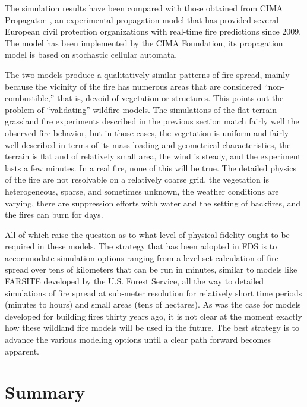 \documentclass[journal,article,atmosphere,submit,moreauthors,pdftex]{Definitions/mdpi}
\begin{document}
The simulation results have been compared with those obtained from CIMA Propagator~\cite{Trucchia:2020}, an experimental propagation model that has provided several European civil protection organizations with real-time fire predictions since 2009. The model has been implemented by the CIMA Foundation, its propagation model is based on stochastic cellular automata.

The two models produce a qualitatively similar patterns of fire spread, mainly because the vicinity of the fire has numerous areas that are considered ``non-combustible,'' that is, devoid of vegetation or structures. This points out the problem of ``validating'' wildfire models. The simulations of the flat terrain grassland fire experiments described in the previous section match fairly well the observed fire behavior, but in those cases, the vegetation is uniform and fairly well described in terms of its mass loading and geometrical characteristics, the terrain is flat and of relatively small area, the wind is steady, and the experiment lasts a few minutes. In a real fire, none of this will be true. The detailed physics of the fire are not resolvable on a relatively coarse grid, the vegetation is heterogeneous, sparse, and sometimes unknown, the weather conditions are varying, there are suppression efforts with water and the setting of backfires, and the fires can burn for days.

All of which raise the question as to what level of physical fidelity ought to be required in these models. The strategy that has been adopted in FDS is to accommodate simulation options ranging from a level set calculation of fire spread over tens of kilometers that can be run in minutes, similar to models like FARSITE developed by the U.S. Forest Service, all the way to detailed simulations of fire spread at sub-meter resolution for relatively short time periods (minutes to hours) and small areas (tens of hectares). As was the case for models developed for building fires thirty years ago, it is not clear at the moment exactly how these wildland fire models will be used in the future. The best strategy is to advance the various modeling options until a clear path forward becomes apparent.


\section{Summary} \label{sec:summary}
\end{document}
